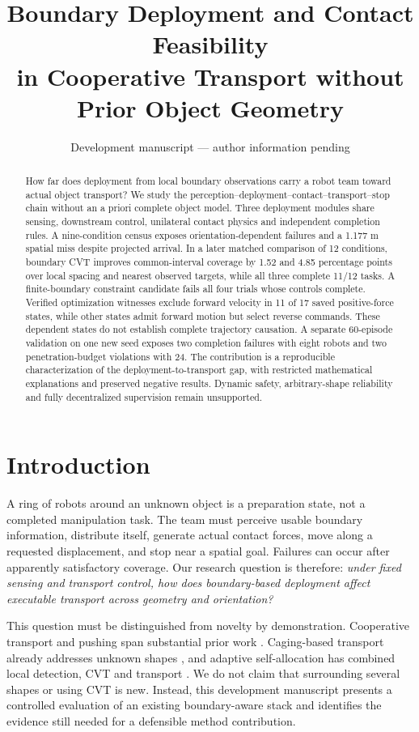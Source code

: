 \documentclass[letterpaper,10pt,conference]{ieeeconf}
\title{Boundary Deployment and Contact Feasibility\\in Cooperative Transport without Prior Object Geometry}
\author{Development manuscript --- author information pending}
\begin{document}
\maketitle
\begin{abstract}
How far does deployment from local boundary observations carry a robot team toward actual object transport? We study the perception--deployment--contact--transport--stop chain without an a priori complete object model. Three deployment modules share sensing, downstream control, unilateral contact physics and independent completion rules. A nine-condition census exposes orientation-dependent failures and a 1.177 m spatial miss despite projected arrival. In a later matched comparison of 12 conditions, boundary CVT improves common-interval coverage by 1.52 and 4.85 percentage points over local spacing and nearest observed targets, while all three complete 11/12 tasks. A finite-boundary constraint candidate fails all four trials whose controls complete. Verified optimization witnesses exclude forward velocity in 11 of 17 saved positive-force states, while other states admit forward motion but select reverse commands. These dependent states do not establish complete trajectory causation. A separate 60-episode validation on one new seed exposes two completion failures with eight robots and two penetration-budget violations with 24. The contribution is a reproducible characterization of the deployment-to-transport gap, with restricted mathematical explanations and preserved negative results. Dynamic safety, arbitrary-shape reliability and fully decentralized supervision remain unsupported.
\end{abstract}

\section{Introduction}
A ring of robots around an unknown object is a preparation state, not a completed manipulation task. The team must perceive usable boundary information, distribute itself, generate actual contact forces, move along a requested displacement, and stop near a spatial goal. Failures can occur after apparently satisfactory coverage. Our research question is therefore: \emph{under fixed sensing and transport control, how does boundary-based deployment affect executable transport across geometry and orientation?}

This question must be distinguished from novelty by demonstration. Cooperative transport and pushing span substantial prior work \cite{tuci2018,stuber2020}. Caging-based transport already addresses unknown shapes \cite{vardharajan2021}, and adaptive self-allocation has combined local detection, CVT and transport \cite{song2026}. We do not claim that surrounding several shapes or using CVT is new. Instead, this development manuscript presents a controlled evaluation of an existing boundary-aware stack and identifies the evidence still needed for a defensible method contribution.
\end{document}
